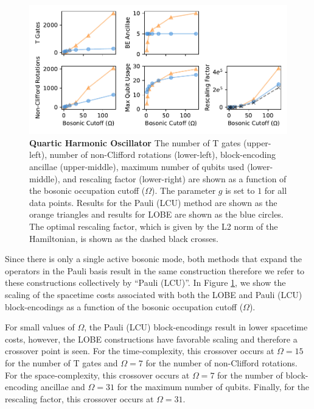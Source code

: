 \begin{figure}
    \label{fig:qosc}
    \includegraphics[width = 16cm]{figures/quartic_oscillator.pdf}
    \caption{
        \textbf{Quartic Harmonic Oscillator}
        The number of T gates (upper-left), number of non-Clifford rotations (lower-left), block-encoding ancillae (upper-middle), maximum number of qubits used (lower-middle), and rescaling factor (lower-right) are shown as a function of the bosonic occupation cutoff ($\Omega$).
        The parameter $g$ is set to $1$ for all data points.
        Results for the Pauli (LCU) method are shown as the orange triangles and results for LOBE are shown as the blue circles.
        The optimal rescaling factor, which is given by the L2 norm of the Hamiltonian, is shown as the dashed black crosses.
    }
\end{figure}

Since there is only a single active bosonic mode, both methods that expand the operators in the Pauli basis result in the same construction therefore we refer to these constructions collectively by ``Pauli (LCU)''.
In Figure \ref{fig:qosc}, we show the scaling of the spacetime costs associated with both the LOBE and Pauli (LCU) block-encodings as a function of the bosonic occupation cutoff ($\Omega$).

For small values of $\Omega$, the Pauli (LCU) block-encodings result in lower spacetime costs, however, the LOBE constructions have favorable scaling and therefore a crossover point is seen.
For the time-complexity, this crossover occurs at $\Omega = 15$ for the number of T gates and $\Omega = 7$ for the number of non-Clifford rotations.
For the space-complexity, this crossover occurs at $\Omega = 7$ for the number of block-encoding ancillae and $\Omega = 31$ for the maximum number of qubits.
Finally, for the rescaling factor, this crossover occurs at $\Omega = 31$.
